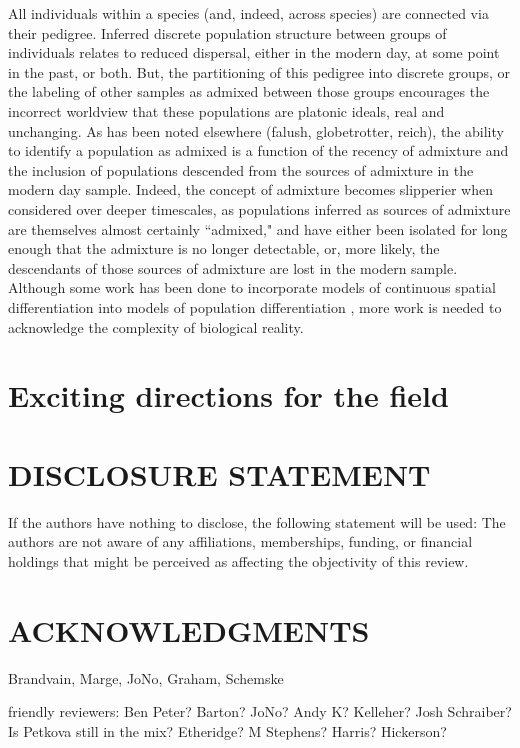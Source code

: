 \documentclass{ar-1col}
\newcommand{\g}[1]{{\color{blue}{#1}}}
\newcommand{\todo}[1]{{\textbf{\color{red}{#1}}}}
\begin{document}
All individuals within a species 
(and, indeed, across species) 
are connected via their pedigree.  
Inferred discrete population structure between groups of individuals 
relates to reduced dispersal, 
either in the modern day, at some point in the past, or both.
But, the partitioning of this pedigree into discrete groups, 
or the labeling of other samples as admixed between those groups
encourages the incorrect worldview that these populations are platonic ideals,
real and unchanging.
As has been noted elsewhere (falush, globetrotter, reich),
the ability to identify a population as admixed
is a function of the recency of admixture and
the inclusion of populations descended 
from the sources of admixture in the modern day sample.
Indeed, the concept of admixture becomes slipperier when considered over deeper timescales,
as populations inferred as sources of admixture are themselves almost certainly ``admixed,"
and have either been isolated for long enough that the admixture is no longer detectable,
or, more likely, the descendants of those sources of admixture are lost in the modern sample.
Although some work has been done to incorporate models of continuous spatial differentiation 
into models of population differentiation \cite{conStruct}, 
more work is needed to acknowledge the complexity of biological reality.

\g{feel like i'm not making the point clearly}

\todo{read through, edit, rewrite?}

\section{Exciting directions for the field}

\todo{
\begin{itemize}
\item what about selection?
\item recap - complicate the world
\item the past
\end{itemize}
}

\section*{DISCLOSURE STATEMENT}
If the authors have nothing to disclose, the following statement will be used: The authors are not aware of any affiliations, memberships, funding, or financial holdings that
might be perceived as affecting the objectivity of this review.

\section*{ACKNOWLEDGMENTS}
Brandvain, Marge, JoNo, Graham, Schemske


friendly reviewers:
Ben Peter? Barton? JoNo? Andy K? Kelleher? Josh Schraiber? Is Petkova still in the mix?
Etheridge? M Stephens? Harris? Hickerson?



\end{document}
